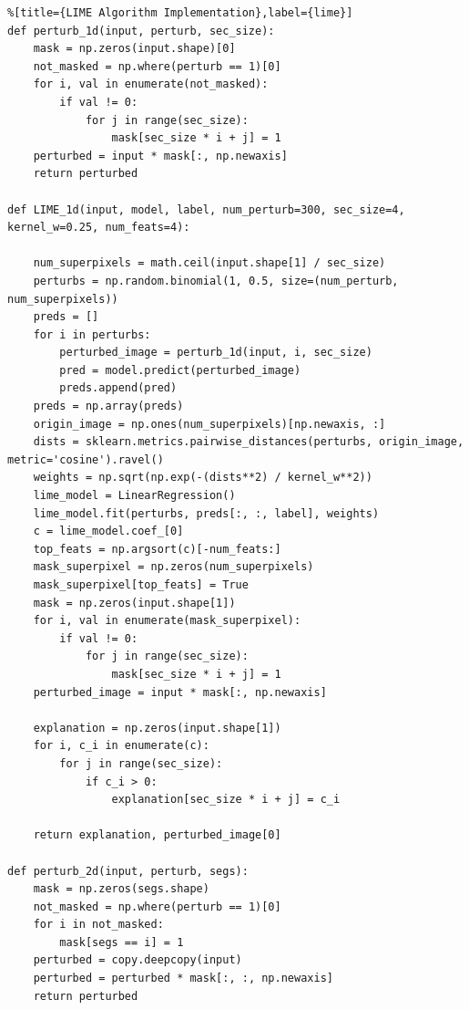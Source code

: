 \documentclass[conference]{IEEEtran}
\begin{document}
\begin{lstlisting}%[title={LIME Algorithm Implementation},label={lime}]
def perturb_1d(input, perturb, sec_size):
    mask = np.zeros(input.shape)[0]
    not_masked = np.where(perturb == 1)[0]
    for i, val in enumerate(not_masked):
        if val != 0:
            for j in range(sec_size):
                mask[sec_size * i + j] = 1
    perturbed = input * mask[:, np.newaxis]
    return perturbed

def LIME_1d(input, model, label, num_perturb=300, sec_size=4, kernel_w=0.25, num_feats=4):

    num_superpixels = math.ceil(input.shape[1] / sec_size)
    perturbs = np.random.binomial(1, 0.5, size=(num_perturb, num_superpixels))
    preds = []
    for i in perturbs:
        perturbed_image = perturb_1d(input, i, sec_size)
        pred = model.predict(perturbed_image)
        preds.append(pred)
    preds = np.array(preds)
    origin_image = np.ones(num_superpixels)[np.newaxis, :]
    dists = sklearn.metrics.pairwise_distances(perturbs, origin_image, metric='cosine').ravel()
    weights = np.sqrt(np.exp(-(dists**2) / kernel_w**2))
    lime_model = LinearRegression()
    lime_model.fit(perturbs, preds[:, :, label], weights)
    c = lime_model.coef_[0]
    top_feats = np.argsort(c)[-num_feats:]
    mask_superpixel = np.zeros(num_superpixels)
    mask_superpixel[top_feats] = True
    mask = np.zeros(input.shape[1])
    for i, val in enumerate(mask_superpixel):
        if val != 0:
            for j in range(sec_size):
                mask[sec_size * i + j] = 1
    perturbed_image = input * mask[:, np.newaxis]

    explanation = np.zeros(input.shape[1])
    for i, c_i in enumerate(c):
        for j in range(sec_size):
            if c_i > 0:
                explanation[sec_size * i + j] = c_i

    return explanation, perturbed_image[0]

def perturb_2d(input, perturb, segs):
    mask = np.zeros(segs.shape)
    not_masked = np.where(perturb == 1)[0]
    for i in not_masked:
        mask[segs == i] = 1
    perturbed = copy.deepcopy(input)
    perturbed = perturbed * mask[:, :, np.newaxis]
    return perturbed



\end{lstlisting}
\end{document}
